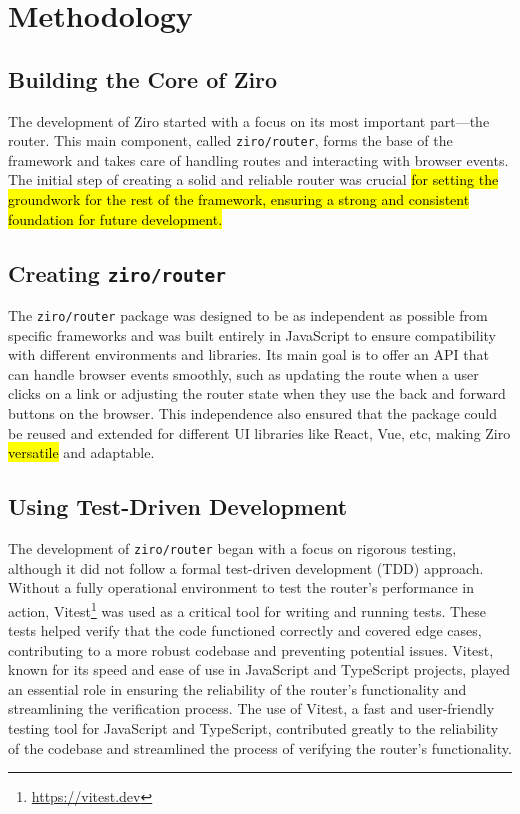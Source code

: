 \section{Methodology} %

\subsection{Building the Core of Ziro}
The development of Ziro started with a focus on its most important part—the router. This main component, called \texttt{ziro/router}, forms the base of the framework and takes care of handling routes and interacting with browser events. The initial step of creating a solid and reliable router was crucial \hl{for setting the groundwork for the rest of the framework, ensuring a strong and consistent foundation for future development.}

\subsection{Creating \texttt{ziro/router}}
The \texttt{ziro/router} package was designed to be as independent as possible from specific frameworks and was built entirely in JavaScript to ensure compatibility with different environments and libraries. Its main goal is to offer an API that can handle browser events smoothly, such as updating the route when a user clicks on a link or adjusting the router state when they use the back and forward buttons on the browser. This independence also ensured that the package could be reused and extended for different UI libraries like React, Vue, etc, making Ziro \hl{versatile} and adaptable.

\subsection{Using Test-Driven Development}
The development of \texttt{ziro/router} began with a focus on rigorous testing, although it did not follow a formal test-driven development (TDD) approach. Without a fully operational environment to test the router's performance in action, Vitest\footnote{\url{https://vitest.dev}} was used as a critical tool for writing and running tests. These tests helped verify that the code functioned correctly and covered edge cases, contributing to a more robust codebase and preventing potential issues. Vitest, known for its speed and ease of use in JavaScript and TypeScript projects, played an essential role in ensuring the reliability of the router's functionality and streamlining the verification process. The use of Vitest, a fast and user-friendly testing tool for JavaScript and TypeScript, contributed greatly to the reliability of the codebase and streamlined the process of verifying the router's functionality.

